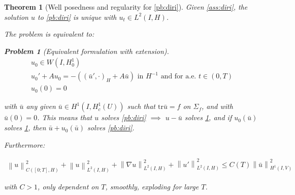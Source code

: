 \documentclass[english,a4paper,12pt,oneside]{scrbook}
\theoremstyle{break}
\newtheorem{thm}[equation]{Theorem}
\newtheorem{pb}[equation]{Problem}
\theoremstyle{remark}
\newcommand{\norm}[1]{\left\lVert#1\right\rVert}
\newcommand{\tr}{\text{tr}}
\begin{document}
\begin{thm}[Well posedness and regularity for \cref{pb:diri}]
\label{prop:diri_wp}
Given \cref{ass:diri}, the solution $u$ to \cref{pb:diri} is unique with $u_t \in L^2(I,H)$. 


The problem is equivalent to:

\begin{pb}[Equivalent formulation with extension]
\label{pb:diri_ext}
\begin{align}
u_0 \in W(I,H^1_0) \\
u_0' + A u_0 = -((\bar{u}',\cdot)_H+A \bar{u}) \text{ in }H^{-1} \text{ and for a.e. } t \in (0,T) \\
u_0(0)=0
\end{align}
\end{pb}

with $\bar{u}$ any given $\bar{u}\in H^1(I,H^1_c(U))$ such that $\tr \bar{u} =f$ on $\Sigma_f$, and with $\bar{u}(0)=0$. This means that $u$ solves \cref{pb:diri} $\implies$ $u-\bar{u}$ solves \cref{pb:diri_ext}, and if $u_0(\bar{u})$ solves  \cref{pb:diri_ext}, then $\bar{u}+u_0(\bar{u})$ solves \cref{pb:diri}.

Furthermore: 

\begin{align}
\norm{u}^2_{C([0;T],H)}+\norm{u}_{L^2(I,H)}^2+ \norm{\nabla u}_{L^2(I,H)}^2 + \norm{u'}^2_{L^2(I,H)}\leq C(T)\norm{\bar{u}}_{H^1(I,V)}^2
\end{align}

with $C>1$, only dependent on $T$, smoothly, exploding for large $T$.

\end{thm}
\end{document}
